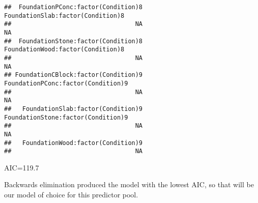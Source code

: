 \documentclass[
]{article}
\begin{document}
\begin{verbatim}
##  FoundationPConc:factor(Condition)8    FoundationSlab:factor(Condition)8  
##                                  NA                                   NA  
##  FoundationStone:factor(Condition)8    FoundationWood:factor(Condition)8  
##                                  NA                                   NA  
## FoundationCBlock:factor(Condition)9   FoundationPConc:factor(Condition)9  
##                                  NA                                   NA  
##   FoundationSlab:factor(Condition)9   FoundationStone:factor(Condition)9  
##                                  NA                                   NA  
##   FoundationWood:factor(Condition)9  
##                                  NA
\end{verbatim}

AIC=119.7

Backwards elimination produced the model with the lowest AIC, so that
will be our model of choice for this predictor pool.
\end{document}
